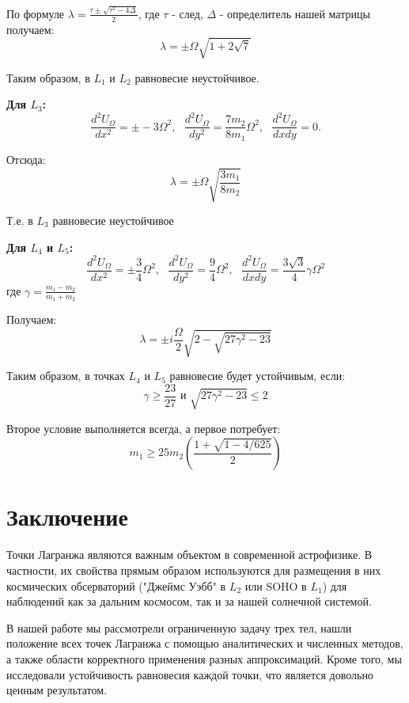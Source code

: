 \documentclass[a4paper]{article} %
\begin{document}
По формуле $\lambda = \frac{\tau \pm \sqrt{\tau^2 - 4\Delta}}{2}$, где $\tau$ - след, $\Delta$ - определитель нашей матрицы получаем:
\begin{equation}
\lambda = \pm\Omega\sqrt{1 + 2\sqrt{7}}
\end{equation}

Таким образом, в $L_1$ и $L_2$ равновесие неустойчивое.

\textbf{Для $L_3$:}
\begin{equation}
\frac{d^2U_\Omega}{dx^2} = \pm -3\Omega^2, \text{ }\frac{d^2U_\Omega}{dy^2} =  \frac{7m_2}{8m_1}\Omega^2, \text{ }\frac{d^2U_\Omega}{dxdy} = 0.
\end{equation}

Отсюда:
\begin{equation}
\lambda = \pm\Omega\sqrt{\frac{3m_1}{8m_2}}
\end{equation}

Т.е. в $L_3$ равновесие неустойчивое

\textbf{Для $L_4$ и $L_5$:}
\begin{equation}
\frac{d^2U_\Omega}{dx^2} = \pm \frac{3}{4}\Omega^2, \text{ }\frac{d^2U_\Omega}{dy^2} =  \frac{9}{4}\Omega^2, \text{ }\frac{d^2U_\Omega}{dxdy} = \frac{3\sqrt{3}}{4}\gamma\Omega^2
\end{equation}
где $\gamma = \frac{m_1 - m_2}{m_1 + m_2}$

Получаем:
\begin{equation}
\lambda = \pm i\frac{\Omega}{2}\sqrt{2 - \sqrt{27\gamma^2 - 23}}
\end{equation}

Таким образом, в точках $L_4$ и $L_5$ равновесие будет устойчивым, если:
\begin{equation}
\gamma \ge \frac{23}{27} \text{ и } \sqrt{27\gamma^2 - 23} \le 2
\end{equation}

Второе условие выполняется всегда, а первое потребует:
\begin{equation}
m_1 \ge 25m_2\left(\frac{1 + \sqrt{1 - 4/625}}{2}\right)
\end{equation}

\section{Заключение}
Точки Лагранжа являются важным объектом в современной астрофизике. В частности, их свойства прямым образом используются для размещения в них космических обсерваторий ("Джеймс Уэбб" в $L_2$ или SOHO в $L_1$) для наблюдений как за дальним космосом, так и за нашей солнечной системой.

В нашей работе мы рассмотрели ограниченную задачу трех тел, нашли положение всех точек Лагранжа с помощью аналитических и численных методов, а также области корректного применения разных аппроксимаций. Кроме того, мы исследовали устойчивость равновесия каждой точки, что является довольно ценным результатом.
\end{document}
